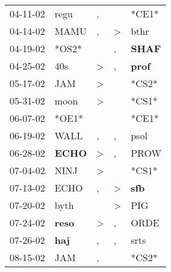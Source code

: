 \begin{supertabular}{p{0.07\textwidth}p{0.06\textwidth}p{0.02\textwidth}p{0.02\textwidth}p{0.06\textwidth}}
          04-11-02\textsuperscript{} &           regu\textsuperscript{} &                , &               &                            *CE1* \\
          04-14-02\textsuperscript{} &           MAMU\textsuperscript{} &                , &  \textgreater &           bthr\textsuperscript{} \\
          04-19-02\textsuperscript{} &                            *OS2* &                  &             , &  \textbf{SHAF\textsuperscript{}} \\
          04-25-02\textsuperscript{} &            40s\textsuperscript{} &     \textgreater &             , &  \textbf{prof\textsuperscript{}} \\
          05-17-02\textsuperscript{} &            JAM\textsuperscript{} &     \textgreater &               &                            *CS2* \\
          05-31-02\textsuperscript{} &           moon\textsuperscript{} &     \textgreater &               &                            *CS1* \\
          06-07-02\textsuperscript{} &                            *OE1* &                  &               &                            *CE1* \\
          06-19-02\textsuperscript{} &           WALL\textsuperscript{} &                , &             , &           psol\textsuperscript{} \\
          06-28-02\textsuperscript{} &  \textbf{ECHO\textsuperscript{}} &     \textgreater &             , &           PROW\textsuperscript{} \\
          07-04-02\textsuperscript{} &           NINJ\textsuperscript{} &     \textgreater &               &                            *CS1* \\
          07-13-02\textsuperscript{} &           ECHO\textsuperscript{} &                , &  \textgreater &   \textbf{sfb\textsuperscript{}} \\
          07-20-02\textsuperscript{} &           byth\textsuperscript{} &                  &  \textgreater &            PIG\textsuperscript{} \\
          07-24-02\textsuperscript{} &  \textbf{reso\textsuperscript{}} &     \textgreater &             , &           ORDE\textsuperscript{} \\
          07-26-02\textsuperscript{} &   \textbf{haj\textsuperscript{}} &                , &             , &           srts\textsuperscript{} \\
          08-15-02\textsuperscript{} &            JAM\textsuperscript{} &                , &               &                            *CS2* \\

\end{supertabular}
